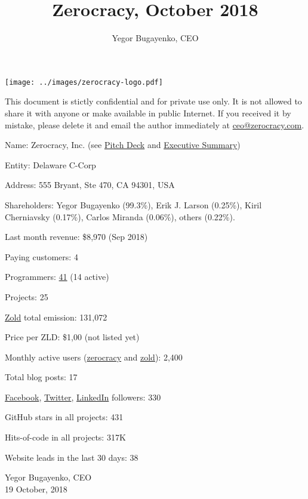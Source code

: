\documentclass{main}
\title{Zerocracy, October 2018}
\author{Yegor Bugayenko, CEO}
\begin{document}
\texttt{[image: ../images/zerocracy-logo.pdf]}

{\small
\colorbox{zred}{}
This document is stictly confidential and for private use only.
It is not allowed to share it with anyone or make available in public
Internet. If you received it by mistake, please delete it and email the author
immediately at \href{mailto:ceo@zerocracy.com}{ceo@zerocracy.com}.}

\vspace{2em}

Name: Zerocracy, Inc. (see
  \href{http://papers.zold.io/zerocracy-deck.pdf}{Pitch Deck} and
  \href{http://papers.zold.io/executive-summary.pdf}{Executive Summary})

Entity: Delaware C-Corp

Address: 555 Bryant, Ste 470, CA 94301, USA

Shareholders:
  Yegor Bugayenko (99.3\%),
  Erik J. Larson (0.25\%),
  Kiril Cherniavsky (0.17\%),
  Carlos Miranda (0.06\%),
  others (0.22\%).

Last month revenue: \$8,970 (Sep 2018)

Paying customers: 4

Programmers: \href{https://www.0crat.com/team}{41} (14 active)

Projects: 25

\href{https://www.zold.io}{Zold} total emission: 131,072

Price per ZLD: \$1,00 (not listed yet)

Monthly active users (\href{https://www.zerocracy.com}{zerocracy} and \href{https://www.zold.io}{zold}): 2,400

Total blog posts: 17

\href{https://www.facebook.com/zerocracy/}{Facebook},
  \href{https://twitter.com/0crat}{Twitter},
  \href{https://www.linkedin.com/company/zerocracy/}{LinkedIn} followers: 330

GitHub stars in all projects: 431

Hits-of-code in all projects: 317K

Website leads in the last 30 days: 38

\vspace{2em}

Yegor Bugayenko, CEO\\
19 October, 2018
\end{document}
